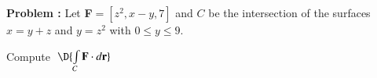 {\bf Problem :} Let {\bf F}$=[z^2,x-y,7]$ and $C$ be the intersection of the surfaces $x=y+z$ and $y=z^2$ with $0 \le y \le 9$.

Compute \,\,$\D{\int \limits_{C} {\bf F} \cdot d{\bf r}}$